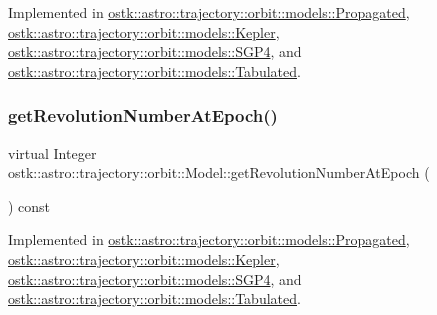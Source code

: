 Implemented in \hyperlink{classostk_1_1astro_1_1trajectory_1_1orbit_1_1models_1_1_propagated_a3bf49ac0824e10057b6abca2cfcc692f}{ostk\+::astro\+::trajectory\+::orbit\+::models\+::\+Propagated}, \hyperlink{classostk_1_1astro_1_1trajectory_1_1orbit_1_1models_1_1_kepler_a01551fd006896966d4d5e4442c182f92}{ostk\+::astro\+::trajectory\+::orbit\+::models\+::\+Kepler}, \hyperlink{classostk_1_1astro_1_1trajectory_1_1orbit_1_1models_1_1_s_g_p4_af577ee4ad56452fe510d325a61a9792e}{ostk\+::astro\+::trajectory\+::orbit\+::models\+::\+S\+G\+P4}, and \hyperlink{classostk_1_1astro_1_1trajectory_1_1orbit_1_1models_1_1_tabulated_a0e92ebaac60e5113989eaadc66062b75}{ostk\+::astro\+::trajectory\+::orbit\+::models\+::\+Tabulated}.

\mbox{\label{classostk_1_1astro_1_1trajectory_1_1orbit_1_1_model_af3f1866f86045da2c05efe4165735cf4}} 
\subsubsection{\texorpdfstring{get\+Revolution\+Number\+At\+Epoch()}{getRevolutionNumberAtEpoch()}}
{\footnotesize\ttfamily virtual Integer ostk\+::astro\+::trajectory\+::orbit\+::\+Model\+::get\+Revolution\+Number\+At\+Epoch (\begin{DoxyParamCaption}{ }\end{DoxyParamCaption}) const\hspace{0.3cm}{\ttfamily [pure virtual]}}



Implemented in \hyperlink{classostk_1_1astro_1_1trajectory_1_1orbit_1_1models_1_1_propagated_a789e4236d2b8b212b1d978055b76abf1}{ostk\+::astro\+::trajectory\+::orbit\+::models\+::\+Propagated}, \hyperlink{classostk_1_1astro_1_1trajectory_1_1orbit_1_1models_1_1_kepler_a2aa5b94462f65ea7e703d319d3e028b3}{ostk\+::astro\+::trajectory\+::orbit\+::models\+::\+Kepler}, \hyperlink{classostk_1_1astro_1_1trajectory_1_1orbit_1_1models_1_1_s_g_p4_a6216f01c1ee37817ca1ae1c7036f942c}{ostk\+::astro\+::trajectory\+::orbit\+::models\+::\+S\+G\+P4}, and \hyperlink{classostk_1_1astro_1_1trajectory_1_1orbit_1_1models_1_1_tabulated_adbd37f167e43cedcb15358c16d62bae8}{ostk\+::astro\+::trajectory\+::orbit\+::models\+::\+Tabulated}.

